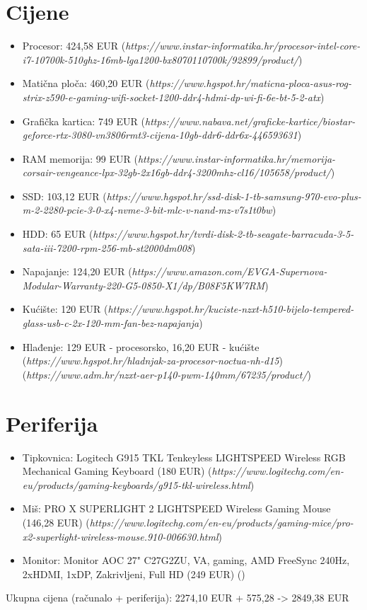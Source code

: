 \documentclass{article}
\begin{document}
\section{Cijene}

\begin{itemize}[label=--]
  \item Procesor: 424,58 EUR
  (\textit{https://www.instar-informatika.hr/procesor-intel-core-i7-10700k-510ghz-16mb-lga1200-bx8070110700k/92899/product/})
  \item Matična ploča: 460,20 EUR
  (\textit{https://www.hgspot.hr/maticna-ploca-asus-rog-strix-z590-e-gaming-wifi-socket-1200-ddr4-hdmi-dp-wi-fi-6e-bt-5-2-atx})
  \item Grafička kartica: 749 EUR
  (\textit{https://www.nabava.net/graficke-kartice/biostar-geforce-rtx-3080-vn3806rmt3-cijena-10gb-ddr6-ddr6x-446593631})
  \item RAM memorija: 99 EUR
  (\textit{https://www.instar-informatika.hr/memorija-corsair-vengeance-lpx-32gb-2x16gb-ddr4-3200mhz-cl16/105658/product/})
  \item SSD: 103,12 EUR
  (\textit{https://www.hgspot.hr/ssd-disk-1-tb-samsung-970-evo-plus-m-2-2280-pcie-3-0-x4-nvme-3-bit-mlc-v-nand-mz-v7s1t0bw})
  \item HDD: 65 EUR
  (\textit{https://www.hgspot.hr/tvrdi-disk-2-tb-seagate-barracuda-3-5-sata-iii-7200-rpm-256-mb-st2000dm008})
  \item Napajanje: 124,20 EUR
  (\textit{https://www.amazon.com/EVGA-Supernova-Modular-Warranty-220-G5-0850-X1/dp/B08F5KW7RM})
  \item Kućište: 120 EUR
  (\textit{https://www.hgspot.hr/kuciste-nzxt-h510-bijelo-tempered-glass-usb-c-2x-120-mm-fan-bez-napajanja})
  \item Hlađenje: 129 EUR - procesorsko, 16,20 EUR - kućište
  (\textit{https://www.hgspot.hr/hladnjak-za-procesor-noctua-nh-d15})
  (\textit{https://www.adm.hr/nzxt-aer-p140-pwm-140mm/67235/product/})
\end{itemize}
\section{Periferija}
\begin{itemize}[label=--]
    \item Tipkovnica: Logitech G915 TKL Tenkeyless LIGHTSPEED Wireless RGB Mechanical Gaming Keyboard (180 EUR)
    (\textit{https://www.logitechg.com/en-eu/products/gaming-keyboards/g915-tkl-wireless.html})
    \item Miš: PRO X SUPERLIGHT 2 LIGHTSPEED Wireless Gaming Mouse (146,28 EUR)
    (\textit{https://www.logitechg.com/en-eu/products/gaming-mice/pro-x2-superlight-wireless-mouse.910-006630.html})
    \item Monitor: Monitor AOC 27" C27G2ZU, VA, gaming, AMD FreeSync 240Hz, 2xHDMI, 1xDP, Zakrivljeni, Full HD (249 EUR)
    ()
\end{itemize}

Ukupna cijena (računalo + periferija): 2274,10 EUR + 575,28 -> 2849,38 EUR 
\end{document}
